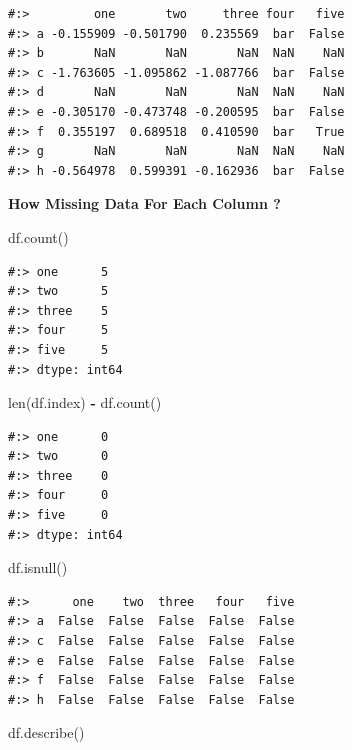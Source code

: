 \documentclass[
]{book}
\newenvironment{Shaded}{\begin{snugshade}}{\end{snugshade}}
\newcommand{\BuiltInTok}[1]{#1}
\newcommand{\NormalTok}[1]{#1}
\newcommand{\OperatorTok}[1]{\textcolor[rgb]{0.43,0.43,0.43}{\textbf{#1}}}
\begin{document}
\begin{verbatim}
#:>         one       two     three four   five
#:> a -0.155909 -0.501790  0.235569  bar  False
#:> b       NaN       NaN       NaN  NaN    NaN
#:> c -1.763605 -1.095862 -1.087766  bar  False
#:> d       NaN       NaN       NaN  NaN    NaN
#:> e -0.305170 -0.473748 -0.200595  bar  False
#:> f  0.355197  0.689518  0.410590  bar   True
#:> g       NaN       NaN       NaN  NaN    NaN
#:> h -0.564978  0.599391 -0.162936  bar  False
\end{verbatim}

\textbf{How Missing Data For Each Column ?}

\begin{Shaded}
\begin{Highlighting}[]
\NormalTok{df.count()}
\end{Highlighting}
\end{Shaded}

\begin{verbatim}
#:> one      5
#:> two      5
#:> three    5
#:> four     5
#:> five     5
#:> dtype: int64
\end{verbatim}

\begin{Shaded}
\begin{Highlighting}[]
\BuiltInTok{len}\NormalTok{(df.index) }\OperatorTok{-}\NormalTok{ df.count()}
\end{Highlighting}
\end{Shaded}

\begin{verbatim}
#:> one      0
#:> two      0
#:> three    0
#:> four     0
#:> five     0
#:> dtype: int64
\end{verbatim}

\begin{Shaded}
\begin{Highlighting}[]
\NormalTok{df.isnull()}
\end{Highlighting}
\end{Shaded}

\begin{verbatim}
#:>      one    two  three   four   five
#:> a  False  False  False  False  False
#:> c  False  False  False  False  False
#:> e  False  False  False  False  False
#:> f  False  False  False  False  False
#:> h  False  False  False  False  False
\end{verbatim}

\begin{Shaded}
\begin{Highlighting}[]
\NormalTok{df.describe()}
\end{Highlighting}
\end{Shaded}
\end{document}
